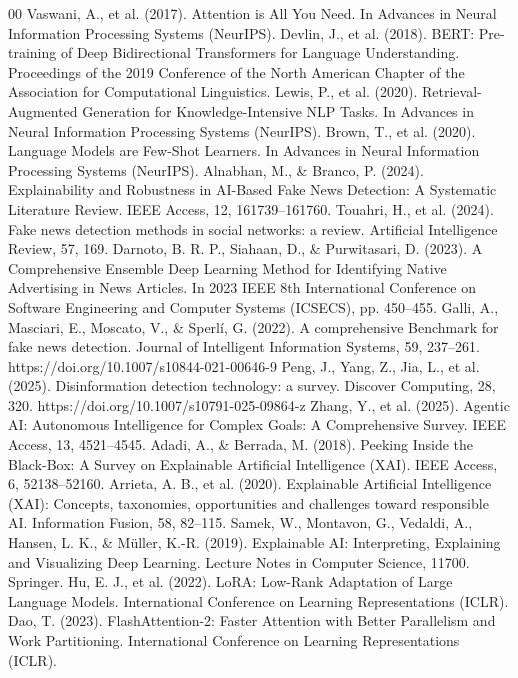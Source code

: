 \documentclass{ieeeaccess}
\begin{document}
\begin{thebibliography}{00}
 Vaswani, A., et al. (2017). Attention is All You Need. In Advances in Neural Information Processing Systems (NeurIPS).
 Devlin, J., et al. (2018). BERT: Pre-training of Deep Bidirectional Transformers for Language Understanding. Proceedings of the 2019 Conference of the North American Chapter of the Association for Computational Linguistics.
 Lewis, P., et al. (2020). Retrieval-Augmented Generation for Knowledge-Intensive NLP Tasks. In Advances in Neural Information Processing Systems (NeurIPS).
 Brown, T., et al. (2020). Language Models are Few-Shot Learners. In Advances in Neural Information Processing Systems (NeurIPS).
 Alnabhan, M., \& Branco, P. (2024). Explainability and Robustness in AI-Based Fake News Detection: A Systematic Literature Review. IEEE Access, 12, 161739--161760.
 Touahri, H., et al. (2024). Fake news detection methods in social networks: a review. Artificial Intelligence Review, 57, 169.
 Darnoto, B. R. P., Siahaan, D., \& Purwitasari, D. (2023). A Comprehensive Ensemble Deep Learning Method for Identifying Native Advertising in News Articles. In 2023 IEEE 8th International Conference on Software Engineering and Computer Systems (ICSECS), pp. 450--455.
 Galli, A., Masciari, E., Moscato, V., \& Sperlí, G. (2022). A comprehensive Benchmark for fake news detection. Journal of Intelligent Information Systems, 59, 237--261. https://doi.org/10.1007/s10844-021-00646-9
 Peng, J., Yang, Z., Jia, L., et al. (2025). Disinformation detection technology: a survey. Discover Computing, 28, 320. https://doi.org/10.1007/s10791-025-09864-z
 Zhang, Y., et al. (2025). Agentic AI: Autonomous Intelligence for Complex Goals: A Comprehensive Survey. IEEE Access, 13, 4521--4545.
 Adadi, A., \& Berrada, M. (2018). Peeking Inside the Black-Box: A Survey on Explainable Artificial Intelligence (XAI). IEEE Access, 6, 52138--52160.
 Arrieta, A. B., et al. (2020). Explainable Artificial Intelligence (XAI): Concepts, taxonomies, opportunities and challenges toward responsible AI. Information Fusion, 58, 82--115.
 Samek, W., Montavon, G., Vedaldi, A., Hansen, L. K., \& Müller, K.-R. (2019). Explainable AI: Interpreting, Explaining and Visualizing Deep Learning. Lecture Notes in Computer Science, 11700. Springer.
 Hu, E. J., et al. (2022). LoRA: Low-Rank Adaptation of Large Language Models. International Conference on Learning Representations (ICLR).
 Dao, T. (2023). FlashAttention-2: Faster Attention with Better Parallelism and Work Partitioning. International Conference on Learning Representations (ICLR).

\end{thebibliography}
\end{document}
